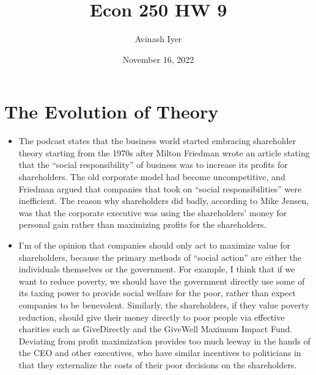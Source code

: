 \documentclass[8pt]{extarticle}
\title{Econ 250 HW 9}
\author{Avinash Iyer}
\date{November 16, 2022}
\begin{document}
{
\maketitle
\section*{The Evolution of Theory}
\begin{itemize}
	\item The podcast states that the business world started embracing shareholder theory starting from the 1970s after Milton Friedman wrote an article stating that the ``social responsibility'' of business was to increase its profits for shareholders. The old corporate model had become uncompetitive, and Friedman argued that companies that took on ``social responsibilities'' were inefficient. The reason why shareholders did badly, according to Mike Jensen, was that the corporate executive was using the shareholders' money for personal gain rather than maximizing profits for the shareholders.
	\item I'm of the opinion that companies should only act to maximize value for shareholders, because the primary methods of ``social action'' are either the individuals themselves or the government. For example, I think that if we want to reduce poverty, we should have the government directly use some of its taxing power to provide social welfare for the poor, rather than expect companies to be benevolent. Similarly, the shareholders, if they value poverty reduction, should give their money directly to poor people via effective charities such as GiveDirectly and the GiveWell Maximum Impact Fund. Deviating from profit maximization provides too much leeway in the hands of the CEO and other executives, who have similar incentives to politicians in that they externalize the costs of their poor decisions on the shareholders.
\end{itemize}
}
\end{document}
